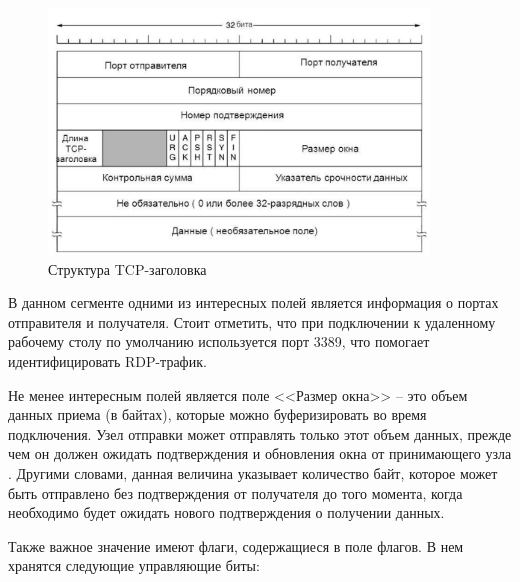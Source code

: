 \documentclass[bachelor, och, coursework]{SCWorks}
\begin{document}
  \begin{figure}[H]
    \centering
    \includegraphics[width=0.9\textwidth]{pics/tcp-segment.png}
    \caption{Структура TCP-заголовка}
    \label{tcp-header}
  \end{figure}

В данном сегменте одними из интересных полей является информация о портах отправителя и получателя. Стоит отметить, что при подключении к 
удаленному рабочему столу по умолчанию используется порт 3389, что помогает идентифицировать RDP-трафик.

Не менее интересным полей является поле <<Размер окна>> -- это объем данных приема (в байтах), которые можно буферизировать во время подключения. 
Узел отправки может отправлять только этот объем данных, прежде чем он должен ожидать подтверждения и обновления окна от принимающего узла \cite{winsize}.
Другими словами, данная величина указывает количество байт, которое может быть отправлено без подтверждения от получателя до того момента, когда 
необходимо будет ожидать нового подтверждения о получении данных.

Также важное значение имеют флаги, содержащиеся в поле флагов. В нем хранятся следующие управляющие биты:
\end{document}
